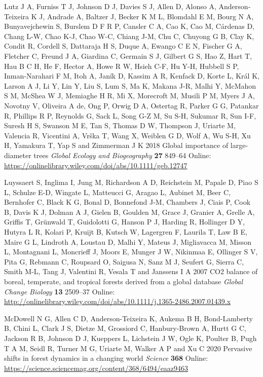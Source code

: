 \documentclass[
]{article}
\begin{document}
\leavevmode\hypertarget{ref-lutz_global_2018}{}%
Lutz J A, Furniss T J, Johnson D J, Davies S J, Allen D, Alonso A,
Anderson‐Teixeira K J, Andrade A, Baltzer J, Becker K M L, Blomdahl E M,
Bourg N A, Bunyavejchewin S, Burslem D F R P, Cansler C A, Cao K, Cao M,
Cárdenas D, Chang L-W, Chao K-J, Chao W-C, Chiang J-M, Chu C, Chuyong G
B, Clay K, Condit R, Cordell S, Dattaraja H S, Duque A, Ewango C E N,
Fischer G A, Fletcher C, Freund J A, Giardina C, Germain S J, Gilbert G
S, Hao Z, Hart T, Hau B C H, He F, Hector A, Howe R W, Hsieh C-F, Hu
Y-H, Hubbell S P, Inman‐Narahari F M, Itoh A, Janík D, Kassim A R,
Kenfack D, Korte L, Král K, Larson A J, Li Y, Lin Y, Liu S, Lum S, Ma K,
Makana J-R, Malhi Y, McMahon S M, McShea W J, Memiaghe H R, Mi X,
Morecroft M, Musili P M, Myers J A, Novotny V, Oliveira A de, Ong P,
Orwig D A, Ostertag R, Parker G G, Patankar R, Phillips R P, Reynolds G,
Sack L, Song G-Z M, Su S-H, Sukumar R, Sun I-F, Suresh H S, Swanson M E,
Tan S, Thomas D W, Thompson J, Uriarte M, Valencia R, Vicentini A, Vrška
T, Wang X, Weiblen G D, Wolf A, Wu S-H, Xu H, Yamakura T, Yap S and
Zimmerman J K 2018 Global importance of large-diameter trees
\emph{Global Ecology and Biogeography} \textbf{27} 849--64 Online:
\url{https://onlinelibrary.wiley.com/doi/abs/10.1111/geb.12747}

\leavevmode\hypertarget{ref-luyssaert_co2_2007}{}%
Luyssaert S, Inglima I, Jung M, Richardson A D, Reichstein M, Papale D,
Piao S L, Schulze E-D, Wingate L, Matteucci G, Aragao L, Aubinet M, Beer
C, Bernhofer C, Black K G, Bonal D, Bonnefond J-M, Chambers J, Ciais P,
Cook B, Davis K J, Dolman A J, Gielen B, Goulden M, Grace J, Granier A,
Grelle A, Griffis T, Grünwald T, Guidolotti G, Hanson P J, Harding R,
Hollinger D Y, Hutyra L R, Kolari P, Kruijt B, Kutsch W, Lagergren F,
Laurila T, Law B E, Maire G L, Lindroth A, Loustau D, Malhi Y, Mateus J,
Migliavacca M, Misson L, Montagnani L, Moncrieff J, Moors E, Munger J W,
Nikinmaa E, Ollinger S V, Pita G, Rebmann C, Roupsard O, Saigusa N, Sanz
M J, Seufert G, Sierra C, Smith M-L, Tang J, Valentini R, Vesala T and
Janssens I A 2007 CO2 balance of boreal, temperate, and tropical forests
derived from a global database \emph{Global Change Biology} \textbf{13}
2509--37 Online:
\url{http://onlinelibrary.wiley.com/doi/abs/10.1111/j.1365-2486.2007.01439.x}

\leavevmode\hypertarget{ref-mcdowell_pervasive_2020}{}%
McDowell N G, Allen C D, Anderson-Teixeira K, Aukema B H, Bond-Lamberty
B, Chini L, Clark J S, Dietze M, Grossiord C, Hanbury-Brown A, Hurtt G
C, Jackson R B, Johnson D J, Kueppers L, Lichstein J W, Ogle K, Poulter
B, Pugh T A M, Seidl R, Turner M G, Uriarte M, Walker A P and Xu C 2020
Pervasive shifts in forest dynamics in a changing world \emph{Science}
\textbf{368} Online:
\url{https://science.sciencemag.org/content/368/6494/eaaz9463}
\end{document}
